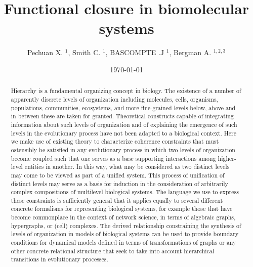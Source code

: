 \documentclass[aps,twocolumn]{revtex4-1}
\begin{document}
 

\title{\bf Functional closure in biomolecular systems}

\author{Pechuan X. $^{1}$, Smith C. $^{1}$, BASCOMPTE .J $^{1}$, Bergman A. $^{1,2,3}$}


\date{\today}
\begin{abstract}
Hierarchy is a fundamental organizing concept in biology. The existence of a number of apparently discrete levels of organization including molecules, cells, organisms, populations, communities, ecosystems, and more fine-grained levels below, above and in between these are taken for granted. Theoretical constructs capable of integrating information about such levels of organization and of explaining the emergence of such levels in the evolutionary process have not been adapted to a biological context. Here we make use of existing theory to characterize coherence constraints that must ostensibly be satisfied in any evolutionary process in which two levels of organization become coupled such that one serves as a base supporting interactions among higher-level entities in another. In this way, what may be considered as two distinct levels may come to be viewed as part of a unified system. This process of unification of distinct levels may serve as a basis for induction in the consideration of arbitrarily complex compositions of multilevel biological systems. The language we use to express these constraints is sufficiently general that it applies equally to several different concrete formalisms for representing biological systems, for example those that have become commonplace in the context of network science, in terms of algebraic graphs, hypergraphs, or (cell) complexes. The derived relationship constraining the synthesis of levels of organization in models of biological systems can be used to provide boundary conditions for dynamical models defined in terms of transformations of graphs or any other concrete relational structure that seek to take into account hierarchical transitions in evolutionary processes.
\end{abstract}

\maketitle
\end{document}
